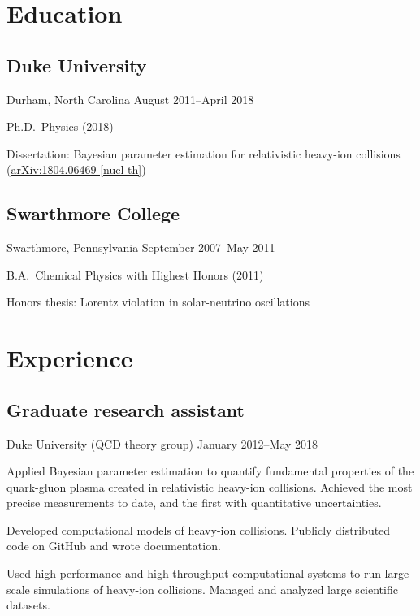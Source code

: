 \documentclass[letterpaper,10pt]{article}
\begin{document}
\begin{multicols}{2}

\newcommand{\subheading}[3]{{\small #1 \hfill #2--#3}}

\section{Education}

\subsection{Duke University}
\subheading{Durham, North Carolina}{August 2011}{April 2018}

Ph.D.\ Physics (2018)

Dissertation: Bayesian parameter estimation for relativistic heavy-ion collisions
(\href{https://arxiv.org/abs/1804.06469}{arXiv:1804.06469 [nucl-th]})

\subsection{Swarthmore College}
\subheading{Swarthmore, Pennsylvania}{September 2007}{May 2011}

B.A.\ Chemical Physics with Highest Honors (2011)

Honors thesis: Lorentz violation in solar-neutrino oscillations


\section{Experience}

\subsection{Graduate research assistant}
\subheading{Duke University (QCD theory group)}{January 2012}{May 2018}

Applied Bayesian parameter estimation to quantify fundamental properties of the quark-gluon plasma created in relativistic heavy-ion collisions.
Achieved the most precise measurements to date, and the first with quantitative uncertainties.

Developed computational models of heavy-ion collisions.
Publicly distributed code on GitHub and wrote documentation.

Used high-performance and high-throughput computational systems to run large-scale simulations of heavy-ion collisions.
Managed and analyzed large scientific datasets.


\end{multicols}
\end{document}

